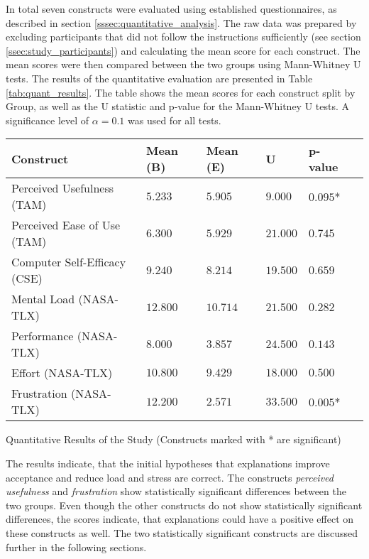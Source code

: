 In total seven constructs were evaluated using established questionnaires, as described in section \ref{sssec:quantitative_analysis}. The raw data was prepared by excluding participants that did not follow the instructions sufficiently (see section \ref{ssec:study_participants}) and calculating the mean score for each construct. The mean scores were then compared between the two groups using Mann-Whitney U tests. The results of the quantitative evaluation are presented in Table \ref{tab:quant_results}. The table shows the mean scores for each construct split by Group, as well as the U statistic and p-value for the Mann-Whitney U tests. A significance level of $\alpha = 0.1$ was used for all tests.

\begin{ctable}
    \begin{tabularx}{\textwidth}{l|X|X|X|X|X}
        \textbf{Construct} & \textbf{Mean (B)} & \textbf{Mean (E)} & \textbf{U} & \textbf{p-value} \\
        \hline
        Perceived Usefulness (TAM) & $5.233$ &  $5.905$ &  $9.000$ &  $0.095$* \\
        Perceived Ease of Use (TAM) & $6.300$ &  $5.929$ &  $21.000$ &  $0.745$ \\
        Computer Self-Efficacy (CSE) & $9.240$ &  $8.214$ &  $19.500$ &  $0.659$ \\
        Mental Load (\ac{NASA}-\ac{TLX}) & $12.800$ &  $10.714$ &  $21.500$ &  $0.282$ \\
        Performance (\ac{NASA}-\ac{TLX}) & $8.000$ &  $3.857$ &  $24.500$ &  $0.143$ \\
        Effort (\ac{NASA}-\ac{TLX}) & $10.800$ &  $9.429$ &  $18.000$ &  $0.500$ \\
        Frustration (\ac{NASA}-\ac{TLX}) & $12.200$ &  $2.571$ &  $33.500$ &  $0.005$* \\
    \end{tabularx}
    \caption[Quantitative Results of the Study]{Quantitative Results of the Study (Constructs marked with * are significant)}
    \label{tab:quant_results}
\end{ctable}

The results indicate, that the initial hypotheses that explanations improve acceptance and reduce load and stress are correct. The constructs \textit{perceived usefulness} and \textit{frustration} show statistically significant differences between the two groups. Even though the other constructs do not show statistically significant differences, the scores indicate, that explanations could have a positive effect on these constructs as well. The two statistically significant constructs are discussed further in the following sections.

